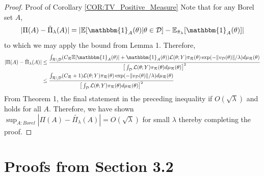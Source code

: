 \documentclass[10pt,fleqn]{article}
\newcommand{\bb}[1]{\mathbb{#1}} \newcommand{\mc}[1]{\mathcal{#1}}
\DeclareMathOperator{\1}{\mathbbm{1}} \DeclareMathOperator{\bigO}{\mc O}
\begin{document}
\begin{proof}{Proof of Corollary \ref{COR:TV_Positive_Measure}}
Note that for any Borel set $A$, 
$$|\Pi(A) - \tilde{\Pi}_{\lambda}(A) | = | \bb E[\mathbbm{1}_A(\theta)|\theta\in \mc D] - \bb E_{\tilde{\pi}_{\lambda}}[\mathbbm{1}_A(\theta) ]|$$
to which we may apply the bound from Lemma 1. Therefore,
\begin{align*}
|\Pi(A) - \tilde{\Pi}_{\lambda}(A) | &\le \frac{\int_{\mathcal{R}\setminus \mathcal{D}}
(C_\mathcal{R}\bb E|\mathbbm{1}_A(\theta)|+\mathbbm{1}_A(\theta)) \mathcal{L}(\theta; Y)
\pi_\mathcal{R}(\theta)\exp(-\|v_{\mc D}(\theta)\|/\lambda )
d\mu_\mathcal{R}(\theta)}{\big[\int_\mathcal{D} \mathcal{L}(\theta; Y)
\pi_\mathcal{R}(\theta)d\mu_\mathcal{R}(\theta)\big]^2 } \\
&\le \frac{\int_{\mathcal{R}\setminus \mathcal{D}}
(C_\mathcal{R}+1) \mathcal{L}(\theta; Y)
\pi_\mathcal{R}(\theta)\exp(-\|v_{\mc D}(\theta)\|/\lambda )
d\mu_\mathcal{R}(\theta)}{\big[\int_\mathcal{D} \mathcal{L}(\theta; Y)
\pi_\mathcal{R}(\theta)d\mu_\mathcal{R}(\theta)\big]^2 }
\end{align*}
From Theorem 1, the final statement in the preceding inequality if $O(\sqrt{\lambda})$ and holds for all $A$.  Therefore, we have shown $\sup_{A: Borel}|\Pi(A)-\tilde{\Pi_\lambda}(A)| =O(\sqrt{\lambda})$ for small $\lambda$ thereby completing the proof.

\end{proof}

\section{Proofs from Section 3.2}
\end{document}

